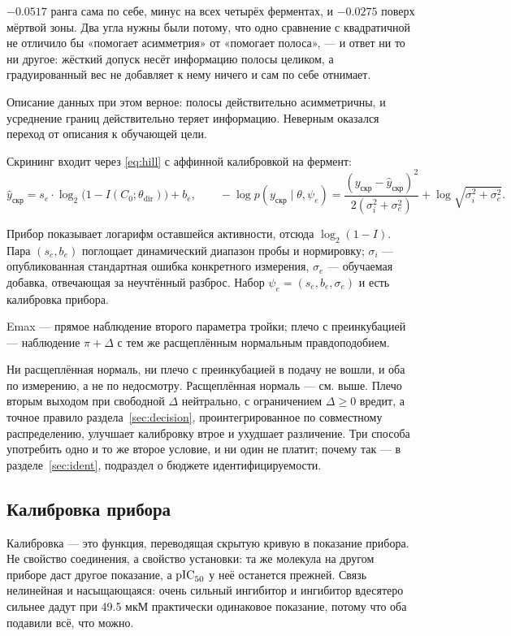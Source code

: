 $-0.0517$ ранга сама по себе, минус на всех четырёх ферментах, и $-0.0275$ поверх мёртвой зоны. Два
угла нужны были потому, что одно сравнение с квадратичной не отличило бы «помогает асимметрия» от
«помогает полоса», --- и ответ ни то ни другое: жёсткий допуск несёт информацию полосы целиком, а
градуированный вес не добавляет к нему ничего и сам по себе отнимает.

Описание данных при этом верное: полосы действительно асимметричны, и усреднение границ действительно
теряет информацию. Неверным оказался переход от описания к обучающей цели.

Скрининг входит через \eqref{eq:hill} с аффинной калибровкой на фермент:
\begin{equation}
\hat y_{\text{скр}} = s_e \cdot \log_2\bigl(1 - I(C_0;\theta_{\text{dir}})\bigr) + b_e,
\qquad
-\log p(y_{\text{скр}} \mid \theta,\psi_e)
= \frac{(y_{\text{скр}} - \hat y_{\text{скр}})^2}{2(\sigma_i^2 + \sigma_e^2)} + \log\sqrt{\sigma_i^2+\sigma_e^2}.
\label{eq:scr}
\end{equation}

Прибор показывает логарифм оставшейся активности, отсюда $\log_2(1-I)$. Пара $(s_e, b_e)$ поглощает
динамический диапазон пробы и нормировку; $\sigma_i$ --- опубликованная стандартная ошибка конкретного
измерения, $\sigma_e$ --- обучаемая добавка, отвечающая за неучтённый разброс. Набор
$\psi_e = (s_e, b_e, \sigma_e)$ и есть калибровка прибора.

Emax --- прямое наблюдение второго параметра тройки; плечо с преинкубацией --- наблюдение $\pi + \Delta$
с тем же расщеплённым нормальным правдоподобием.

Ни расщеплённая нормаль, ни плечо с преинкубацией в подачу не вошли, и оба по измерению, а не по
недосмотру. Расщеплённая нормаль --- см. выше. Плечо вторым выходом при свободной $\Delta$ нейтрально,
с ограничением $\Delta \ge 0$ вредит, а точное правило раздела~\ref{sec:decision},
проинтегрированное по совместному распределению, улучшает калибровку втрое и ухудшает различение.
Три способа употребить одно и то же второе условие, и ни один не платит; почему так --- в
разделе~\ref{sec:ident}, подраздел о бюджете идентифицируемости.

\subsection{Калибровка прибора}
\label{sec:calib}

Калибровка --- это функция, переводящая скрытую кривую в показание прибора. Не свойство соединения,
а свойство установки: та же молекула на другом приборе даст другое показание, а $\mathrm{pIC}_{50}$ у неё останется
прежней. Связь нелинейная и насыщающаяся: очень сильный ингибитор и ингибитор вдесятеро сильнее дадут
при 49.5 мкМ практически одинаковое показание, потому что оба подавили всё, что можно.

